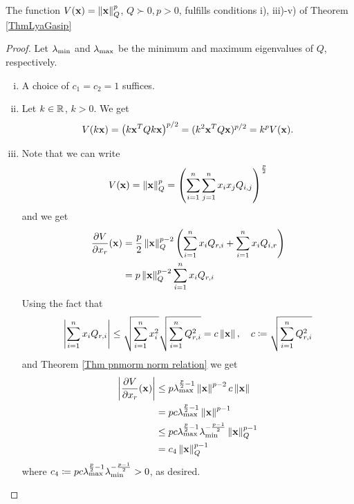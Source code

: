 \documentclass[a4paper,12pt,twoside,BCOR=10mm]{scrbook}
\begin{document}
\begin{theorem}
The function $V(\mathbf{x}) = \left\lVert\mathbf{x}\right\rVert_Q^p$, $Q\succ 0, p > 0$, fulfills conditions i), iii)-v) of Theorem \ref{ThmLyaGasip}
\end{theorem}
\begin{proof}
Let $\lambda_{\min}$ and $\lambda_{\max}$ be the minimum and maximum eigenvalues of $Q$, respectively.
\begin{enumerate}[i)]
    \item A choice of $c_1 = c_2 = 1$ suffices.
\setcounter{enumi}{2}
    \item Let $k\in\mathbb{R}^{}$, $k > 0$. We get
        \begin{align*}
            V(k\mathbf{x}) = \left(k\mathbf{x}^TQk\mathbf{x}\right)^{p/2} = (k^2 \mathbf{x}^T Q \mathbf{x})^{p / 2} = k^p V(\mathbf{x}).
        \end{align*}
    \item Note that we can write
        \begin{align*}
            V(\mathbf{x}) = \left\lVert\mathbf{x}\right\rVert_Q^p = \left(\sum_{i = 1}^n \sum_{j = 1}^n x_ix_j Q_{i, j}\right)^\frac{p}{2}
        \end{align*}
        and we get
        \begin{align*}
            \frac{\partial V}{\partial x_r} (\mathbf{x}) &= \frac{p}{2}\left\lVert\mathbf{x}\right\rVert_{Q}^{p - 2} \left(\sum_{i = 1}^n x_i Q_{r, i} + \sum_{i = 1}^n x_i Q_{i, r}\right)\\
            &= p\left\lVert\mathbf{x}\right\rVert_{Q}^{p - 2} \sum_{i = 1}^n x_i Q_{r,i}\\
        \end{align*}
        Using the fact that
        \begin{align*}
            \left\lvert \sum_{i = 1}^n x_i Q_{r,i} \right\rvert \leq \sqrt{\sum\limits_{i = 1}^nx_i^2}\sqrt{\sum\limits_{i = 1}^n Q_{r,i}^2} = c\left\lVert\mathbf{x}\right\rVert, \quad c \coloneqq \sqrt{\sum\limits_{i = 1}^n Q_{r,i}^2}
        \end{align*}
        and Theorem \ref{Thm pnmorm norm relation} we get
        \begin{align*}
            \left | \frac{\partial V}{\partial x_r}(\mathbf{x}) \right | &\leq p\lambda_{\max}^{\frac{p}{2} - 1} \left\lVert\mathbf{x}\right\rVert^{p - 2}c\left\lVert\mathbf{x}\right\rVert\\
            &= pc\lambda_{\max}^{\frac{p}{2}-1}\left\lVert\mathbf{x}\right\rVert^{p-1}\\
            &\leq pc\lambda_{\max}^{\frac{p}{2}-1}\lambda_{\min}^{-\frac{p -1}{2}} \left\lVert\mathbf{x}\right\rVert_{Q}^{p - 1}\\
            &= c_4 \left\lVert\mathbf{x}\right\rVert_{Q}^{p-1}
        \end{align*}
        where $c_4 \coloneqq pc\lambda_{\max}^{\frac{p}{2}-1}\lambda_{\min}^{-\frac{p -1}{2}} > 0$, as desired.

\end{enumerate}
\end{proof}
\end{document}
